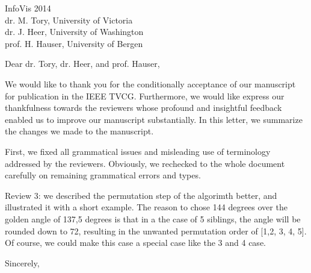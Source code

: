 \documentclass{letter}
\begin{document}
\begin{letter}{InfoVis 2014 \\ dr. M. Tory, University of Victoria \\ dr. J. Heer, University of Washington \\ prof. H. Hauser, University of Bergen}
\opening{Dear dr. Tory, dr. Heer, and prof. Hauser,}

We would like to thank you for the conditionally acceptance of our manuscript for publication in the IEEE TVCG. Furthermore, we would like express our thankfulness towards the reviewers whose profound and insightful feedback enabled us to improve our manuscript substantially. In this letter, we summarize the changes we made to the manuscript.

First, we fixed all grammatical issues and misleading use of terminology addressed by the reviewers. Obviously, we rechecked to the whole document carefully on remaining grammatical errors and types.


Review 3: we described the permutation step of the algorimth better, and illustrated it with a short example. The reason to chose 144 degrees over the golden angle of 137,5 degrees is that in a the case of 5 siblings, the angle will be rounded down to 72, resulting in the unwanted permutation order of [1,2, 3, 4, 5]. Of course, we could make this case a special case like the 3 and 4 case.



\closing{Sincerely,}
\end{letter}
\end{document}
